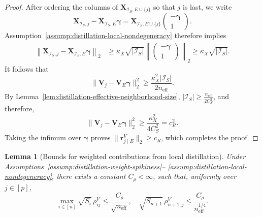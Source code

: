 \documentclass[12pt]{article}
\newtheorem{lemma}{Lemma}
\theoremstyle{definition}
\begin{document}
\begin{proof}
After ordering the columns of
\(\boldsymbol X_{\mathcal I_S,E\cup\{j\}}\) so that \(j\) is last, we write
\[
    \boldsymbol X_{\mathcal I_S,j}
    -
    \boldsymbol X_{\mathcal I_S,E}\boldsymbol{\gamma}
    =
    \boldsymbol X_{\mathcal I_S,E\cup\{j\}}
    \begin{pmatrix}
        -\boldsymbol{\gamma}\\
        1
    \end{pmatrix}.
\]
Assumption~\ref{assump:distillation-local-nondegeneracy} therefore
implies
\begin{align*}
    \left\|
        \boldsymbol X_{\mathcal I_S,j}
        -
        \boldsymbol X_{\mathcal I_S,E}\boldsymbol{\gamma}
    \right\|_2
    &\ge
    \kappa_X\sqrt{|\mathcal I_S|}
    \left\|
        \begin{pmatrix}
            -\boldsymbol{\gamma}\\
            1
        \end{pmatrix}
    \right\|_2
    \ge
    \kappa_X\sqrt{|\mathcal I_S|}.
\end{align*}
It follows that
\[
    \|\boldsymbol V_j-\boldsymbol V_E\boldsymbol{\gamma}\|_2^2
    \ge
    \frac{\kappa_X^2|\mathcal I_S|}
         {2n_{\mathrm{eff}}}.
\]
By Lemma~\ref{lem:distillation-effective-neighborhood-size}, $|\mathcal I_S|\ge\frac{n_{\mathrm{eff}}}{2C_S^2}$, and therefore,
\[
    \|\boldsymbol V_j-\boldsymbol V_E\boldsymbol{\gamma}\|_2^2
    \ge
    \frac{\kappa_X^2}{4C_S^2}
    =
    c_R^2.
\]
Taking the infimum over \(\boldsymbol{\gamma}\) proves $\|\boldsymbol r_{j\mid E}^V\|_2\ge c_R$, which completes the proof.
\end{proof}

\begin{lemma}[Bounds for weighted contributions from local distillation]
\label{lem:distillation-native-comparison-bounds}
Under Assumptions~\ref{assump:distillation-weight-spikiness}--%
\ref{assump:distillation-local-nondegeneracy}, there exists a constant
$C_\rho<\infty$, such that, uniformly over $j\in[p]$,
\[
    \max_{i\in[n]}
    \sqrt{S_i}\,\rho_{ij}^V
    \le
    \frac{C_\rho}{\sqrt{n_{\mathrm{eff}}}}, \quad
    \sqrt{S_{n+1}}\,\rho_{n+1,j}^V
    \le
    \frac{C_\rho}{n_{\mathrm{eff}}^{1/4}}.
\]
\end{lemma}
\end{document}
